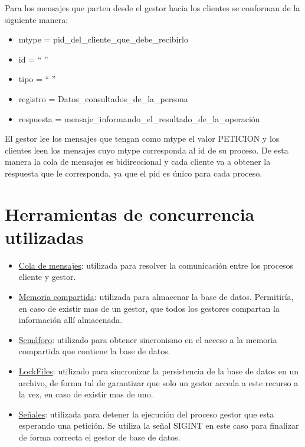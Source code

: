 \documentclass[11pt]{article}
\begin{document}
Para los mensajes que parten desde el gestor hacia los clientes se conforman de la siguiente manera:
\begin{itemize}
 \item mtype = pid\_del\_cliente\_que\_debe\_recibirlo
 \item id = `` ''
 \item tipo = `` ''
 \item registro = Datos\_consultados\_de\_la\_persona
 \item respuesta = mensaje\_informando\_el\_resultado\_de\_la\_operaci\'on
\end{itemize}

El gestor lee los mensajes que tengan como mtype el valor PETICION y los clientes leen los mensajes cuyo mtype corresponda al id de su proceso.
De esta manera la cola de mensajes es bidireccional y cada cliente va a obtener la respuesta que le corresponda, ya que el pid es único para cada proceso.

\section{Herramientas de concurrencia utilizadas}
\begin{itemize}

 \item \underline{Cola de mensajes}: utilizada para resolver la comunicaci\'on entre los procesos cliente y gestor. \\
 \item \underline{Memoria compartida}: utilizada para almacenar la base de datos. Permitir\'ia, en caso de existir mas de un gestor, que todos los gestores 
compartan la informaci\'on all\'i almacenada.  \\
 \item \underline{Sem\'aforo}: utilizado para obtener sincronismo en el acceso a la memoria compartida que contiene la base de datos. \\
 \item \underline{LockFiles}: utilizado para sincronizar la persistencia de la base de datos en un archivo, de forma tal de garantizar que solo un
gestor acceda a este recurso a la vez, en caso de existir mas de uno. \\
 \item \underline{Se\~nales}: utilizada para detener la ejecuci\'on del proceso gestor que esta esperando una petición. Se utiliza la se\~nal SIGINT en este caso para finalizar de forma correcta el gestor de base de datos. \\
\end{itemize}
\end{document}
